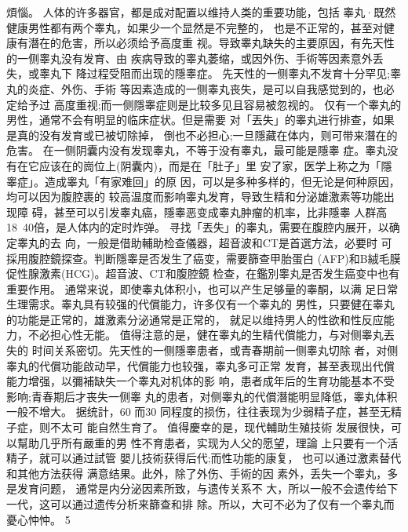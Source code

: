 \documentclass[12pt,UTF8]{ctexbook}
\begin{document}
煩惱。
人体的许多器官，都是成对配置以维持人类的重要功能，包括
睾丸·既然健康男性都有两个睾丸，如果少一个显然是不完整的，
也是不正常的，甚至对健康有潛在的危害，所以必须给予高度重
视。导致睾丸缺失的主要原因，有先天性的一侧睾丸没有发育、由
疾病导致的睾丸萎缩，或因外伤、手術等因素意外丢失，或睾丸下
降过程受阻而出现的隱睾症。
先天性的一侧睾丸不发育十分罕见;睾丸的炎症、外伤、手術
等因素造成的一侧睾丸丧失，是可以自我感觉到的，也必定给予过
高度重视;而一侧隱睾症则是比较多见且容易被忽视的。
仅有一个睾丸的男性，通常不会有明显的临床症状。但是需要
对「丟失」的睾丸进行排查，如果是真的没有发育或已被切除掉，
倒也不必担心;一旦隱藏在体内，则可带来潛在的危害。
在一侧阴囊内没有发现睾丸，不等于没有睾丸，最可能是隱睾
症。睾丸没有在它应该在的崗位上(阴囊内)，而是在「肚子」里
安了家，医学上称之为「隱睾症」。造成睾丸「有家难回」的原
因，可以是多种多样的，但无论是何种原因，均可以因为腹腔裹的
较高温度而影响睾丸发育，导致生精和分泌雄激素等功能出现障
碍，甚至可以引发睾丸癌，隱睾恶变成睾丸肿瘤的机率，比非隱睾
人群高18~40倍，是人体内的定时炸弹。
寻找「丟失」的睾丸，需要在腹腔内展开，以确定睾丸的去
向，一般是借助輔助检查儀器，超音波和CT是首選方法，必要时
可採用腹腔鏡探查。判断隱睾是否发生了癌变，需要篩查甲胎蛋白
(AFP)和B絨毛膜促性腺激素(HCG)。超音波、CT和腹腔鏡
检查，在鑑別睾丸是否发生癌变中也有重要作用。
通常来说，即使睾丸体积小，也可以产生足够量的睾酮，以满
足日常生理需求。睾丸具有较强的代償能力，许多仅有一个睾丸的
男性，只要健在睾丸的功能是正常的，雄激素分泌通常是正常的，
就足以维持男人的性欲和性反应能力，不必担心性无能。
值得注意的是，健在睾丸的生精代償能力，与对侧睾丸丟失的
时间关系密切。先天性的一侧隱睾患者，或青春期前一侧睾丸切除
者，对侧睾丸的代償功能啟动早，代償能力也较强，睾丸多可正常
发育，甚至表现出代償能力增强，以彌補缺失一个睾丸对机体的影
响，患者成年后的生育功能基本不受影响;青春期后才丧失一侧睾
丸的患者，对侧睾丸的代償潛能明显降低，睾丸体积一般不增大。
据统計，60%
而30%
同程度的损伤，往往表现为少弱精子症，甚至无精子症，则不太可
能自然生育了。
值得慶幸的是，现代輔助生殖技術
发展很快，可以幫助几乎所有嚴重的男
性不育患者，实现为人父的愿望，理論
上只要有一个活精子，就可以通过試管
嬰儿技術获得后代;而性功能的康复，
也可以通过激素替代和其他方法获得
满意结果。此外，除了外伤、手術的因
素外，丢失一个睾丸，多是发育问题，
通常是内分泌因素所致，与遗传关系不
大，所以一般不会遗传给下一代，这可以通过遗传分析来篩查和排
除。所以，大可不必为了仅有一个睾丸而憂心忡忡。
5
\end{document}
